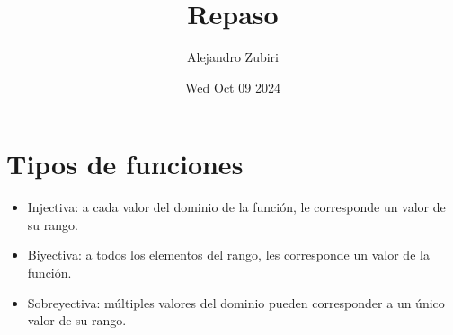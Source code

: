 \documentclass{article}
\author{Alejandro Zubiri}
\date{Wed Oct 09 2024}
\title{Repaso}
\begin{document}
\maketitle
\section{Tipos de funciones}
\begin{itemize}
    \item Injectiva: a cada valor del dominio de la función, le corresponde un valor de su rango.
    \item Biyectiva: a todos los elementos del rango, les corresponde un valor de la función.
    \item Sobreyectiva: múltiples valores del dominio pueden corresponder a un único valor de su rango.
\end{itemize}
\end{document}
